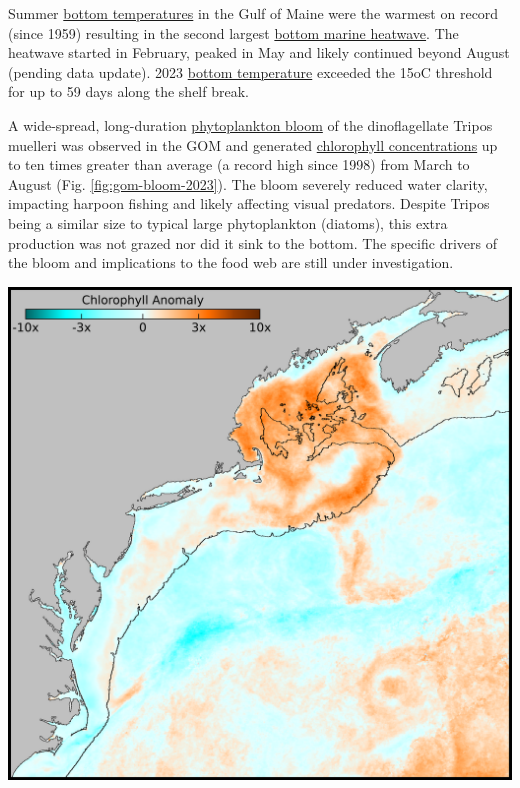 \documentclass[
  10pt,
]{article}
\let\origfigure\figure
\let\endorigfigure\endfigure
\renewenvironment{figure}[1][2] {
    \expandafter\origfigure\expandafter[H]
} {
    \endorigfigure
}
\begin{document}
Summer \href{https://noaa-edab.github.io/catalog/bottom-temperature---seasonal-anomaly.html}{bottom temperatures} in the Gulf of Maine were the warmest on record (since 1959) resulting in the second largest \href{https://noaa-edab.github.io/catalog/marine-heatwaves---bottom.html}{bottom marine heatwave}. The heatwave started in February, peaked in May and likely continued beyond August (pending data update). 2023 \href{https://noaa-edab.github.io/catalog/thermal-habitat-persistence.html}{bottom temperature} exceeded the 15oC threshold for up to 59 days along the shelf break.

A wide-spread, long-duration \href{https://noaa-edab.github.io/catalog/observation-synthesis.html}{phytoplankton bloom} of the dinoflagellate Tripos muelleri was observed in the GOM and generated \href{https://noaa-edab.github.io/catalog/chlorophyll-and-primary-production.html}{chlorophyll concentrations} up to ten times greater than average (a record high since 1998) from March to August (Fig. \ref{fig:gom-bloom-2023}). The bloom severely reduced water clarity, impacting harpoon fishing and likely affecting visual predators. Despite Tripos being a similar size to typical large phytoplankton (diatoms), this extra production was not grazed nor did it sink to the bottom. The specific drivers of the bloom and implications to the food web are still under investigation.

\begin{figure}

{\centering \includegraphics[width=0.6\linewidth]{SOE-NEFMC_files/figure-latex/gom-bloom-2023-1} 

}

\caption{June 2023 chlorophyll anomaly shown as the ratio of the June 2023 average compared to climatological (1998-2023) June average. The black line depicts the 100 m isobath.}\label{fig:gom-bloom-2023}
\end{figure}
\end{document}
